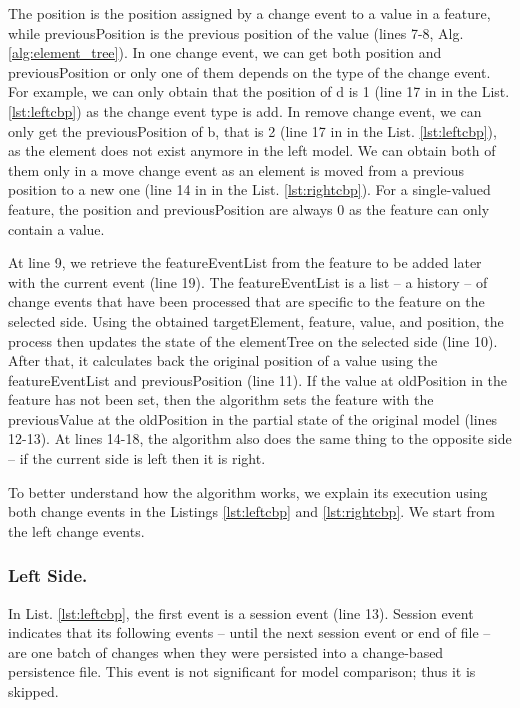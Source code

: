 \documentclass{llncs}
\begin{document}
The \textsf{position} is the position assigned by a change event to a value in a feature, while \textsf{previousPosition} is the previous position of the value (lines 7-8, Alg. \ref{alg:element_tree}). In one change event, we can get both \textsf{position} and \textsf{previousPosition} or only one of them depends on the type of the change event. For example, we can only obtain that the \textsf{position} of \textsf{d} is 1 (line 17 in in the List. \ref{lst:leftcbp}) as the change event type is \textsf{add}. In \textsf{remove} change event, we can only get the \textsf{previousPosition} of \textsf{b}, that is 2 (line 17 in in the List. \ref{lst:leftcbp}), as the element does not exist anymore in the left model. We can obtain both of them only in a \textsf{move} change event as an element is moved from a previous position to a new one (line 14 in in the List. \ref{lst:rightcbp}). For a single-valued feature, the \textsf{position} and \textsf{previousPosition} are always 0 as the feature can only contain a value. 

At line 9, we retrieve the \textsf{featureEventList} from the \textsf{feature} to be added later with the current \textsf{event} (line 19). The \textsf{featureEventList} is a list -- a history -- of change events that have been processed that are specific to the \textsf{feature} on the selected \textsf{side}. Using the obtained \textsf{targetElement}, \textsf{feature}, \textsf{value}, and \textsf{position}, the process then updates the state of the \textsf{elementTree} on the selected \textsf{side} (line 10). After that, it calculates back the original position of a value using the \textsf{featureEventList} and \textsf{previousPosition} (line 11). If the value at \textsf{oldPosition} in the \textsf{feature} has not been set, then the algorithm sets the \textsf{feature} with the \textsf{previousValue} at the \textsf{oldPosition} in the partial state of the original model (lines 12-13). At lines 14-18, the algorithm also does the same thing to the opposite side -- if the current \textsf{side} is \textsf{left} then it is \textsf{right}.  

To better understand how the algorithm works, we explain its execution using both change events in the Listings \ref{lst:leftcbp} and \ref{lst:rightcbp}. We start from the left change events. 

\vspace{-10pt}
\subsubsection{Left Side.}\label{sec:left_side} In List. \ref{lst:leftcbp}, the first event is a \textsf{session} event (line 13). \textsf{Session} event indicates that its following events -- until the next session event or end of file -- are one batch of changes when they were persisted into a change-based persistence file. This event is not significant for model comparison; thus it is skipped. 
\end{document}

